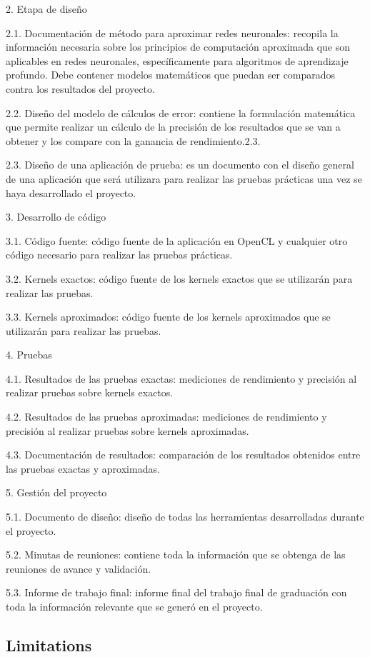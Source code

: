 2. Etapa de diseño

2.1. Documentación de método para aproximar redes neuronales: recopila la información
necesaria sobre los principios de computación aproximada que son aplicables en redes
neuronales, específicamente para algoritmos de aprendizaje profundo. Debe contener
modelos matemáticos que puedan ser comparados contra los resultados del proyecto.

2.2. Diseño del modelo de cálculos de error: contiene la formulación matemática que
permite realizar un cálculo de la precisión de los resultados que se van a obtener y los
compare con la ganancia de rendimiento.2.3.

2.3. Diseño de una aplicación de prueba: es un documento con el diseño general de una
aplicación que será utilizara para realizar las pruebas prácticas una vez se haya
desarrollado el proyecto.


3. Desarrollo de código

3.1. Código fuente: código fuente de la aplicación en OpenCL y cualquier otro código
necesario para realizar las pruebas prácticas.

3.2. Kernels exactos: código fuente de los kernels exactos que se utilizarán para realizar las
pruebas.

3.3. Kernels aproximados: código fuente de los kernels aproximados que se utilizarán para
realizar las pruebas.

4. Pruebas

4.1. Resultados de las pruebas exactas: mediciones de rendimiento y precisión al realizar
pruebas sobre kernels exactos.

4.2. Resultados de las pruebas aproximadas: mediciones de rendimiento y precisión al
realizar pruebas sobre kernels aproximadas.

4.3. Documentación de resultados: comparación de los resultados obtenidos entre las
pruebas exactas y aproximadas.

5. Gestión del proyecto

5.1. Documento de diseño: diseño de todas las herramientas desarrolladas durante el
proyecto.

5.2. Minutas de reuniones: contiene toda la información que se obtenga de las reuniones de
avance y validación.

5.3. Informe de trabajo final: informe final del trabajo final de graduación con toda la
información relevante que se generó en el proyecto.

\subsection{Limitations}


